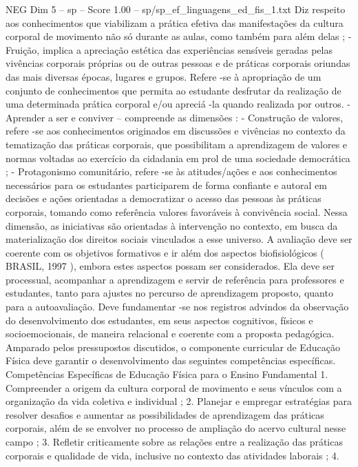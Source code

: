 \begin{textsample}{NEG Dim 5 – sp – Score 1.00 – sp/sp\_ef\_linguagens\_ed\_fis\_1.txt}
Diz respeito aos conhecimentos que viabilizam a prática efetiva das manifestações da cultura corporal de movimento não só durante as aulas, como também para além delas ; - Fruição, implica a apreciação estética das experiências sensíveis geradas pelas vivências corporais próprias ou de outras pessoas e de práticas corporais oriundas das mais diversas épocas, lugares e grupos.
Refere -se à apropriação de um conjunto de conhecimentos que permita ao estudante desfrutar da realização de uma determinada prática corporal e/ou apreciá -la quando realizada por outros. - Aprender a ser e conviver – compreende as dimensões : - Construção de valores, refere -se aos conhecimentos originados em discussões e vivências no contexto da tematização das práticas corporais, que possibilitam a aprendizagem de valores e normas voltadas ao exercício da cidadania em prol de uma sociedade democrática ; - Protagonismo comunitário, refere -se às atitudes/ações e aos conhecimentos necessários para os estudantes participarem de forma confiante e autoral em decisões e ações orientadas a democratizar o acesso das pessoas às práticas corporais, tomando como referência valores favoráveis à convivência social.
Nessa dimensão, as iniciativas são orientadas à intervenção no contexto, em busca da materialização dos direitos sociais vinculados a esse universo.
A avaliação deve ser coerente com os objetivos formativos e ir além dos aspectos biofisiológicos ( BRASIL, 1997 ), embora estes aspectos possam ser considerados.
Ela deve ser processual, acompanhar a aprendizagem e servir de referência para professores e estudantes, tanto para ajustes no percurso de aprendizagem proposto, quanto para a autoavaliação.
Deve fundamentar -se nos registros advindos da observação do desenvolvimento dos estudantes, em seus aspectos cognitivos, físicos e socioemocionais, de maneira relacional e coerente com a proposta pedagógica.
Amparado pelos pressupostos discutidos, o componente curricular de Educação Física deve garantir o desenvolvimento das seguintes competências específicas.
Competências Específicas de Educação Física para o Ensino Fundamental 1.
Compreender a origem da cultura corporal de movimento e seus vínculos com a organização da vida coletiva e individual ; 2.
Planejar e empregar estratégias para resolver desafios e aumentar as possibilidades de aprendizagem das práticas corporais, além de se envolver no processo de ampliação do acervo cultural nesse campo ; 3.
Refletir criticamente sobre as relações entre a realização das práticas corporais e qualidade de vida, inclusive no contexto das atividades laborais ; 4.

\end{textsample}
